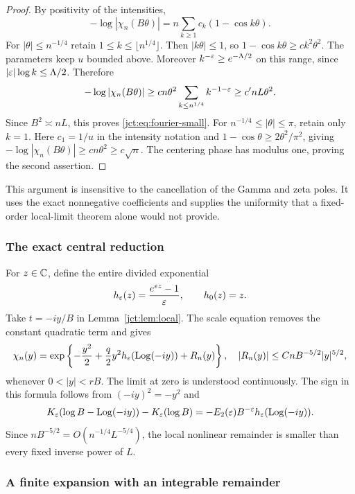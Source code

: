 \begin{proof}
By positivity of the intensities,
\[
 -\log|\chi_n(B\theta)|
  =n\sum_{k\ge1}c_k(1-\cos k\theta).
\]
For $|\theta|\le n^{-1/4}$ retain $1\le k\le\lfloor n^{1/4}\rfloor$.
Then $|k\theta|\le1$, so $1-\cos k\theta\ge c k^2\theta^2$.
The parameters keep $u$ bounded above. Moreover
$k^{-\varepsilon}\ge e^{-\Lambda/2}$ on this range, since
$|\varepsilon|\log k\le\Lambda/2$. Therefore
\[
 -\log|\chi_n(B\theta)|
 \ge c n\theta^2\sum_{k\le n^{1/4}}k^{-1-\varepsilon}
 \ge c' nL\theta^2.
\]
Since $B^2\asymp nL$, this proves \eqref{jct:eq:fourier-small}.
For $n^{-1/4}\le|\theta|\le\pi$, retain only $k=1$.
Here $c_1=1/u$ in the intensity notation and
$1-\cos\theta\ge2\theta^2/\pi^2$, giving
$-\log|\chi_n(B\theta)|\ge c n\theta^2\ge c\sqrt n$.
The centering phase has modulus one, proving the second assertion.
\end{proof}

This argument is insensitive to the cancellation of the Gamma and
zeta poles. It uses the exact nonnegative coefficients and supplies
the uniformity that a fixed-order local-limit theorem alone would
not provide.

\subsubsection{The exact central reduction}

For $z\in\mathbb C$, define the entire divided exponential
\begin{equation}\label{jct:eq:h-epsilon}
 h_\varepsilon(z)=\frac{e^{\varepsilon z}-1}{\varepsilon},\qquad h_0(z)=z.
\end{equation}
Take $t=-iy/B$ in Lemma~\ref{jct:lem:local}. The scale equation removes the
constant quadratic term and gives
\begin{equation}\label{jct:eq:core-characteristic}
 \chi_n(y)=\exp\left\{
     -\frac{y^2}{2}+\frac q2y^2h_\varepsilon(\operatorname{Log}(-iy))+R_n(y)
                       \right\},
 \quad |R_n(y)|\le CnB^{-5/2}|y|^{5/2},
\end{equation}
whenever $0<|y|<rB$. The limit at zero is understood continuously.
The sign in this formula follows from
$(-iy)^2=-y^2$ and
\[
 K_\varepsilon(\log B-\operatorname{Log}(-iy))-K_\varepsilon(\log B)
   =-E_2(\varepsilon)B^{-\varepsilon}h_\varepsilon(\operatorname{Log}(-iy)).
\]
Since $nB^{-5/2}=O(n^{-1/4}L^{-5/4})$, the local nonlinear
remainder is smaller than every fixed inverse power of $L$.

\subsubsection{A finite expansion with an integrable remainder}

